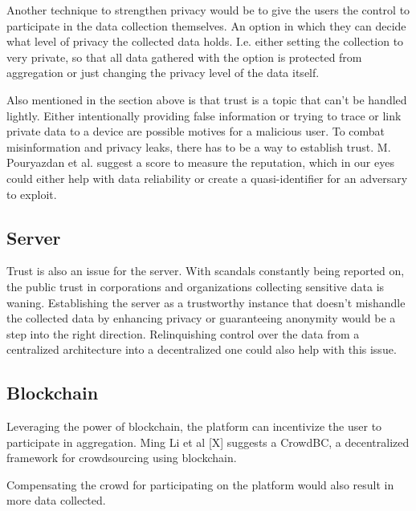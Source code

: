 Another technique to strengthen privacy would be to give the users the control to participate in the data collection themselves. An option in which they can decide what level of privacy the collected data holds. I.e. either setting the collection to very private, so that all data gathered with the option is protected from aggregation or just changing the privacy level of the data itself.

Also mentioned in the section above is that trust is a topic that can't be handled lightly. Either intentionally providing false information or trying to trace or link private data to a device are possible motives for a malicious user. To combat misinformation and privacy leaks, there has to be a way to establish trust. M. Pouryazdan et al. suggest a score to measure the reputation, which in our eyes could either help with data reliability or create a quasi-identifier for an adversary to exploit.

\subsection{Server}
Trust is also an issue for the server. With scandals constantly being reported on, the public trust in corporations and organizations collecting sensitive data is waning. Establishing the server as a trustworthy instance that doesn't mishandle the collected data by enhancing privacy or guaranteeing anonymity would be a step into the right direction. Relinquishing control over the data from a centralized architecture into a decentralized one could also help with this issue.

\subsection{Blockchain}
Leveraging the power of blockchain, the platform can incentivize the user to participate in aggregation. Ming Li et al [X] suggests a CrowdBC, a decentralized framework for crowdsourcing using blockchain. 

Compensating the crowd for participating on the platform would also result in more data collected. 

